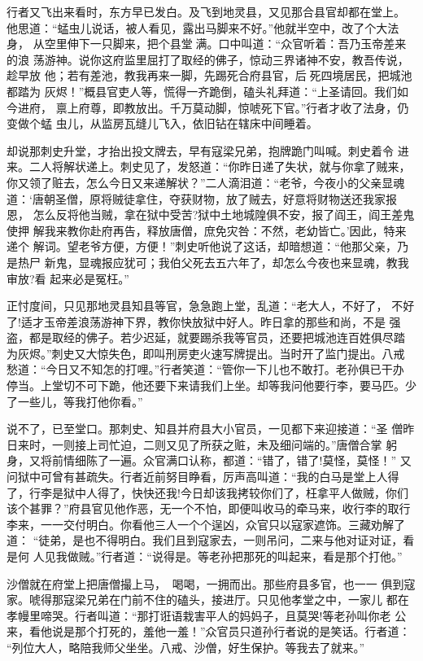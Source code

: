 行者又飞出来看时，东方早已发白。及飞到地灵县，又见那合县官却都在堂上。
他思道：“蜢虫儿说话，被人看见，露出马脚来不好。”他就半空中，改了个大法身，
从空里伸下一只脚来，把个县堂满。口中叫道：“众官听着：吾乃玉帝差来的浪
荡游神。说你这府监里屈打了取经的佛子，惊动三界诸神不安，教吾传说，趁早放
他；若有差池，教我再来一脚，先踢死合府县官，后死四境居民，把城池都踏为
灰烬！”概县官吏人等，慌得一齐跪倒，磕头礼拜道：“上圣请回。我们如今进府，
禀上府尊，即教放出。千万莫动脚，惊唬死下官。”行者才收了法身，仍变做个蜢
虫儿，从监房瓦缝儿飞入，依旧钻在辖床中间睡着。

却说那刺史升堂，才抬出投文牌去，早有寇梁兄弟，抱牌跪门叫喊。刺史着令
进来。二人将解状递上。刺史见了，发怒道：“你昨日递了失状，就与你拿了贼来，
你又领了赃去，怎么今日又来递解状？”二人滴泪道：“老爷，今夜小的父亲显魂
道：‘唐朝圣僧，原将贼徒拿住，夺获财物，放了贼去，好意将财物送还我家报恩，
怎么反将他当贼，拿在狱中受苦?狱中土地城隍俱不安，报了阎王，阎王差鬼使押
解我来教你赴府再告，释放唐僧，庶免灾咎：不然，老幼皆亡。’因此，特来递个
解词。望老爷方便，方便！”刺史听他说了这话，却暗想道：“他那父亲，乃是热尸
新鬼，显魂报应犹可；我伯父死去五六年了，却怎么今夜也来显魂，教我审放?看
起来必是冤枉。”

正忖度间，只见那地灵县知县等官，急急跑上堂，乱道：“老大人，不好了，
不好了!适才玉帝差浪荡游神下界，教你快放狱中好人。昨日拿的那些和尚，不是
强盗，都是取经的佛子。若少迟延，就要踢杀我等官员，还要把城池连百姓俱尽踏
为灰烬。”刺史又大惊失色，即叫刑房吏火速写牌提出。当时开了监门提出。八戒
愁道：“今日又不知怎的打哩。”行者笑道：“管你一下儿也不敢打。老孙俱已干办
停当。上堂切不可下跪，他还要下来请我们上坐。却等我问他要行李，要马匹。少
了一些儿，等我打他你看。”

说不了，已至堂口。那刺史、知县并府县大小官员，一见都下来迎接道：“圣
僧昨日来时，一则接上司忙迫，二则又见了所获之赃，未及细问端的。”唐僧合掌
躬身，又将前情细陈了一遍。众官满口认称，都道：“错了，错了!莫怪，莫怪！”
又问狱中可曾有甚疏失。行者近前努目睁看，厉声高叫道：“我的白马是堂上人得
了，行李是狱中人得了，快快还我!今日却该我拷较你们了，枉拿平人做贼，你们
该个甚罪？”府县官见他作恶，无一个不怕，即便叫收马的牵马来，收行李的取行
李来，一一交付明白。你看他三人一个个逞凶，众官只以寇家遮饰。三藏劝解了道：
“徒弟，是也不得明白。我们且到寇家去，一则吊问，二来与他对证对证，看是何
人见我做贼。”行者道：“说得是。等老孙把那死的叫起来，看是那个打他。”

沙僧就在府堂上把唐僧撮上马，喝喝，一拥而出。那些府县多官，也一一
俱到寇家。唬得那寇梁兄弟在门前不住的磕头，接进厅。只见他孝堂之中，一家儿
都在孝幔里啼哭。行者叫道：“那打诳语栽害平人的妈妈子，且莫哭!等老孙叫你老
公来，看他说是那个打死的，羞他一羞！”众官员只道孙行者说的是笑话。行者道：
“列位大人，略陪我师父坐坐。八戒、沙僧，好生保护。等我去了就来。”


